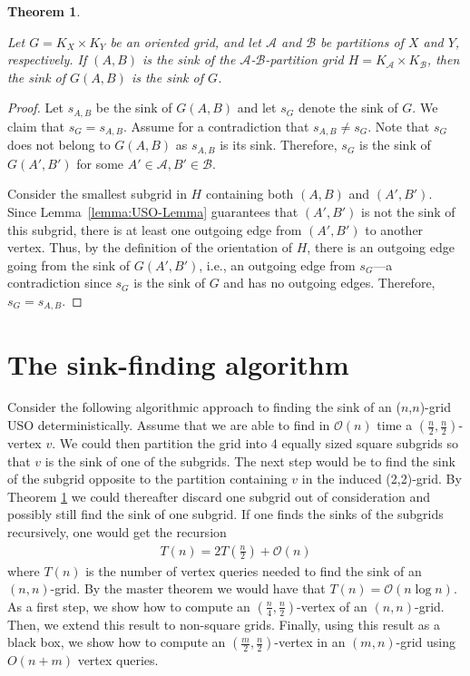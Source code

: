 \documentclass[a4paper,10pt]{article}
\newtheorem{theorem}{Theorem}
\newcommand{\A}{\ensuremath{\mathcal A}}
\newcommand{\B}{\ensuremath{\mathcal B}}
\newcommand{\s}[1]{\ensuremath{s_{\scriptscriptstyle#1}}}
\begin{document}
\begin{theorem}
\label{thm:the_sink_of_the_sink_of_the_induced_orientation_is_the_global_sink}

Let $G = K_X \times K_Y$ be an oriented grid,
and let $\A$ and $\B$ be partitions of $X$ and $Y$, respectively.
If $(A,B)$ is the sink of the $\A$-$\B$-partition grid $H = K_\A \times K_\B$, then the sink of $G(A,B)$ is the sink of $G$.
\end{theorem}
\begin{proof}
Let $\s{A,B}$ be the sink of $G(A,B)$ and let $\s{G}$ denote the sink of $G$.
We claim that $\s{G} = \s{A,B}$.
Assume for a contradiction that $\s{A,B}\neq \s{G}$.
Note that $\s{G}$ does not belong to $G(A,B)$ as $\s{A,B}$ is its sink.
Therefore, $\s{G}$ is the sink of $G(A', B')$ for some $A'\in \A, B'\in \B$.

Consider the smallest subgrid in $H$ containing both $(A,B)$ and $(A', B')$. 
Since Lemma~\ref{lemma:USO-Lemma} guarantees that $(A',B')$ is not the sink of this subgrid, there is at least one outgoing edge from $(A',B')$ to another vertex.
Thus, by the definition of the orientation of $H$, there is an outgoing edge going from the sink of $G(A',B')$, i.e., an outgoing edge from $\s{G}$---a contradiction since $\s{G}$ is the sink of $G$ and has no outgoing edges. 
Therefore, $\s{G} = \s{A,B}$.
\end{proof}



\section{The sink-finding algorithm}
\label{section:the_sink_finding_algorithm}

Consider the following algorithmic approach to finding the sink of an ($n$,$n$)-grid USO deterministically. 
Assume that we are able to find in $\mathcal{O}(n)$ time a $(\frac{n}{2}, \frac{n}{2})$-vertex $v$.
We could then partition the grid into 4 equally sized square subgrids so that $v$ is the sink of one of the subgrids.
The next step would be to find the sink of the subgrid opposite to the partition containing $v$ in the induced (2,2)-grid. 
By Theorem \ref{thm:the_sink_of_the_sink_of_the_induced_orientation_is_the_global_sink} we could thereafter discard one subgrid out of consideration and possibly still find the sink of one subgrid. 
If one finds the sinks of the subgrids recursively, one would get the recursion
\begin{align*}
 T(n) = 2T\left(\frac{n}{2}\right) + \mathcal{O}(n)
\end{align*}
where $T(n)$ is the number of vertex queries needed to find the sink of an $(n,n)$-grid. By the master theorem we would have that $T(n) = \mathcal{O}(n\log n)$. 
As a first step, we show how to compute an $(\frac{n}{4}, \frac{n}{2})$-vertex of an $(n, n)$-grid. Then, we extend this result to non-square grids. Finally, using this result as a black box, we show how to compute an $(\frac{m}{2}, \frac{n}{2})$-vertex in an $(m,n)$-grid using $O(n+m)$ vertex queries. 
\end{document}
